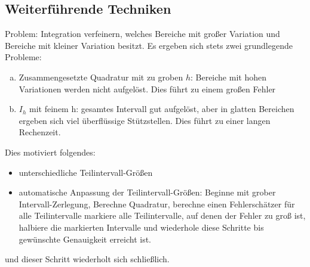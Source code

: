 \documentclass[11pt]{scrartcl}
\begin{document}
\subsection{Weiterführende Techniken}
\begin{seg}
	Problem: Integration verfeinern, welches Bereiche mit großer Variation und Bereiche mit kleiner Variation besitzt. Es ergeben sich stets zwei grundlegende Probleme:
	\begin{enumerate}[a)]
		\item Zusammengesetzte Quadratur mit zu groben $h$: Bereiche mit hohen Variationen werden nicht aufgelöst. Dies führt zu einem großen Fehler
		\item $I_h$ mit feinem h: gesamtes Intervall gut aufgelöst, aber in glatten Bereichen ergeben sich viel überflüssige Stützstellen. Dies führt zu einer langen Rechenzeit.
	\end{enumerate}
\end{seg}
\begin{seg}[Idee:]
	Dies motiviert folgendes:
	\begin{itemize}
		\item unterschiedliche Teilintervall-Größen
		\item automatische Anpassung der Teilintervall-Größen: Beginne mit grober Intervall-Zerlegung, Berechne Quadratur, berechne einen Fehlerschätzer für alle Teilintervalle markiere alle Teilintervalle, auf denen der Fehler zu groß ist, halbiere die markierten Intervalle und wiederhole diese Schritte bis gewünschte Genauigkeit erreicht ist.
	\end{itemize}
\end{seg}
\begin{seg}
	\begin{figure}[ht]
\end{figure}
und dieser Schritt wiederholt sich schließlich.
\end{seg}
\end{document}
